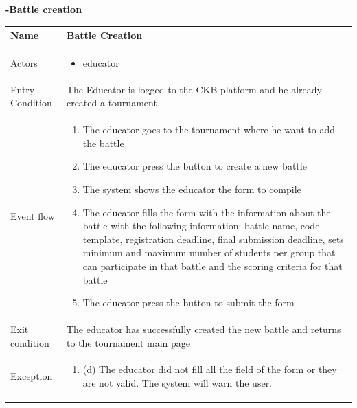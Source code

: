 \begin{enumerate}[label=\textbf{[UC\arabic*]}]
\newpage
 \item \textbf{-Battle creation}
    \\ \begin{tabular}{|l|p{11cm}|}
        \hline
        Name & Battle Creation \\
        \hline
        Actors & \begin{itemize}
                    \item educator
                \end{itemize} \\
        \hline
        Entry Condition & The Educator is logged to the CKB platform and he already created a tournament\\
        \hline
        Event flow & \begin{enumerate}
            \item The educator goes to the tournament where he want to add the battle
            \item The educator press the button to create a new battle
            \item The system shows the educator the form to compile
            \item The educator fills the form with the information about the battle with the following information: battle name, code template, registration deadline, final submission deadline, sets minimum and maximum number of students per group that can participate in that battle and the scoring criteria for that battle
            \item The educator press the button to submit the form
        \end{enumerate}\\
        \hline
        Exit condition & The educator has successfully created the new battle and returns to the tournament main page \\
        \hline
        Exception & \begin{enumerate} [label={}, leftmargin=0.25cm ]
            \item (d) The educator did not fill all the field of the form or they are not valid. The system will warn the user. 
        \end{enumerate}\\
        \hline            
    \end{tabular}


\end{enumerate}
